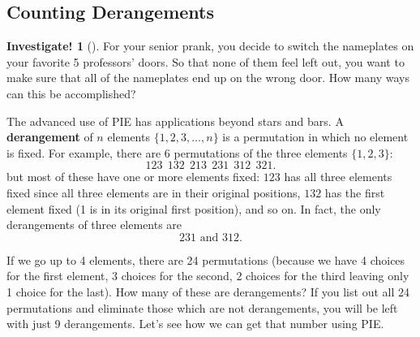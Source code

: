\documentclass[10pt,]{book}
\newcommand{\terminology}[1]{\textbf{#1}}
\theoremstyle{plain}
\theoremstyle{definition}
\theoremstyle{definition}
\theoremstyle{definition}
\newtheorem{investigation}[project]{Investigate!}
\theoremstyle{definition}
\numberwithin{equation}{chapter}
\begin{document}
\subsection[{Counting Derangements}]{Counting Derangements}\label{subsec_derangements}
\begin{investigation}[]\label{investigation-8}
\hypertarget{p-866}{}%
For your senior prank, you decide to switch the nameplates on your favorite 5 professors' doors. So that none of them feel left out, you want to make sure that all of the nameplates end up on the wrong door. How many ways can this be accomplished?%
\end{investigation}
\hypertarget{p-867}{}%
The advanced use of PIE has applications beyond stars and bars. A \terminology{derangement} of \(n\) elements \(\{1,2,3,\ldots, n\}\) is a permutation in which no element is fixed. For example, there are \(6\) permutations of the three elements \(\{1,2,3\}\):%
\begin{equation*}
123 ~~ 132 ~~ 213 ~~ 231 ~~ 312 ~~ 321.
\end{equation*}
but most of these have one or more elements fixed: \(123\) has all three elements fixed since all three elements are in their original positions, \(132\) has the first element fixed (1 is in its original first position), and so on. In fact, the only derangements of three elements are%
\begin{equation*}
231 \text{ and } 312.
\end{equation*}
%
\par
\hypertarget{p-868}{}%
If we go up to 4 elements, there are 24 permutations (because we have 4 choices for the first element, 3 choices for the second, 2 choices for the third leaving only 1 choice for the last). How many of these are derangements? If you list out all 24 permutations and eliminate those which are not derangements, you will be left with just 9 derangements. Let's see how we can get that number using PIE.%
\end{document}
